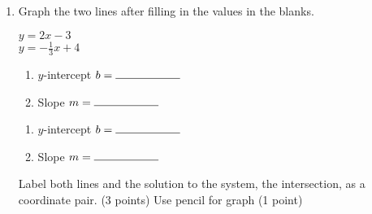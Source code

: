 \documentclass[12pt, twoside]{article}
\begin{document}
\begin{enumerate}
\begin{multicols}{2}
          Line: \hspace{1cm} Solid ($=$) \hspace{0.5cm} Dashed ($\neq$)\\[0.5cm]
          Shading: \hspace{0.3cm} Above ($y>$) \hspace{0.25cm} Below ($y<$)
        \end{multicols}

    \newpage
    \item Graph the two lines after filling in the values in the blanks.\\[0.5cm]


    \begin{multicols}{2}
      $y= 2x -3$ \\
      $y=-\frac{1}{3} x +4 $
    \end{multicols}
    \begin{multicols}{2}
      \raggedcolumns
      \begin{enumerate}
        \item $y$-intercept $b= \rule{2cm}{0.15mm}$ \\[0.5cm]
        \item Slope \hspace{0.7cm} $m= \rule{2cm}{0.15mm}$\\[0.5cm]
      \end{enumerate}
      \begin{enumerate}
        \item $y$-intercept $b= \rule{2cm}{0.15mm}$ \\[0.5cm]
        \item Slope \hspace{0.7cm} $m= \rule{2cm}{0.15mm}$\\[0.5cm]
      \end{enumerate}
    \end{multicols}

    Label both lines and the solution to the system, the intersection, as a coordinate pair. (3 points) Use pencil for graph (1 point)\\

    \begin{center} %
    \end{center}


\end{enumerate}
\end{document}
